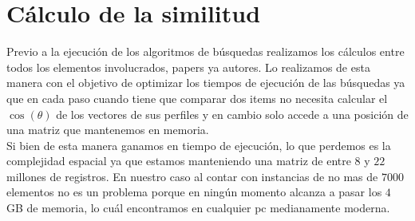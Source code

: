 \section{Cálculo de la similitud}
Previo a la ejecución de los algoritmos de búsquedas realizamos los cálculos entre todos los elementos involucrados, papers ya autores. Lo realizamos de esta manera con el objetivo de optimizar los tiempos de ejecución de las búsquedas ya que en cada paso cuando tiene que comparar dos items no necesita calcular el $\cos(\theta)$ de los vectores de sus perfiles y en cambio solo accede a una posición de una matriz que mantenemos en memoria.\\
Si bien de esta manera ganamos en tiempo de ejecución, lo que perdemos es la complejidad espacial ya que estamos manteniendo una matriz de entre $8$ y $22$ millones de registros. En nuestro caso al contar con instancias de no mas de $7000$ elementos no es un problema porque en ningún momento alcanza a pasar los $4$ GB de memoria, lo cuál encontramos en cualquier pc medianamente moderna.